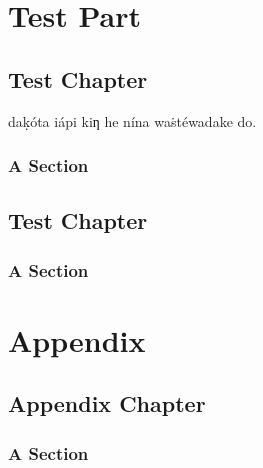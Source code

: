 \documentclass[11pt,a5paper,footinclude=true,headinclude=true]{scrbook} %
\begin{document}
	
	\tableofcontents 


    \cleardoublepage\part{Test Part}
    \chapter{Test Chapter}
    daḳóta iápi kiƞ he nína waṡtéwadake do.
    
    \section{A Section}
    \lipsum[1]
    
    \chapter{Test Chapter}
    \lipsum[1]
    
    \section{A Section}
    \lipsum[1]

%	

    \appendix
    \cleardoublepage\part{Appendix}
    \chapter{Appendix Chapter}
    \lipsum[1]
    
    \section{A Section}
    \lipsum[1]
\end{document}
